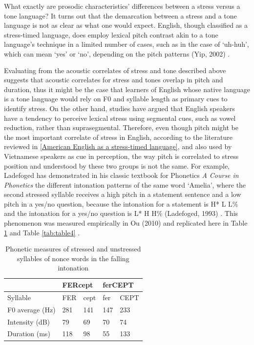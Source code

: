 \documentclass[a4paper]{article}
\begin{document}
What exactly are prosodic characteristics' differences between a stress versus a tone language? It turns out that the demarcation between a stress and a tone language is not as clear as what one would expect. English, though classified as a stress-timed language, does employ lexical pitch contrast akin to a tone language's technique in a limited number of cases, such as in the case of ‘uh-huh', which can mean ‘yes’ or ‘no’, depending on the pitch patterns (Yip, 2002) \cite{Yip:2002aa}. 

Evaluating from the acoustic correlates of stress and tone described above suggests that acoustic correlates for stress and tones overlap in pitch and duration, thus it might be the case that learners of English whose native language is a tone language would rely on F0 and syllable length as primary cues to identify stress. On the other hand, studies have argued that English speakers have a tendency to perceive lexical stress using segmental cues, such as vowel reduction, rather than suprasegmental.
Therefore, even though pitch might be the most important correlate of stress in English, according to the literature reviewed in \ref{American English as a stress-timed language},  and also used by Vietnamese speakers as cue in perception, the way pitch is correlated to stress position and understood by these two groups is not the same. 
 For example, Ladefoged has demonstrated in his classic textbook for Phonetics \textit{A Course in Phonetics} the different intonation patterns of the same word `Amelia', where the second stressed syllable receives a high pitch in a statement sentence and a low pitch in a yes/no question, because the intonation for a statement is H* L L\% and the intonation for a yes/no question is L* H H\% (Ladefoged, 1993) \cite{Ladefoged:1993aa}. This phenomenon was measured empirically in Ou (2010) and replicated here in Table \ref{tab:table3} and Table \ref{tab:table4} \cite{Ou:2010aa}.

\begin{table}[!h]
  \begin{center}
      \caption{Phonetic measures of stressed and unstressed syllables of nonce words in the falling intonation}
\begin{tabular}{lllll}
    \label{tab:table3}
              & \multicolumn{2}{l}{FERcept} & \multicolumn{2}{l}{ferCEPT}  \\ \hline
 Syllable & FER          & cept          &   fer          &      CEPT        \\ \hline
F0 average (Hz) & 281          & 141          &   147           &      233         \\ \hline
Intensity (dB)    & 79           & 69          &      70        &         74    \\ \hline
Duration (ms)     & 118          & 98        &       55      &      133
\end{tabular}
\end{center}
\end{table}
\end{document}
